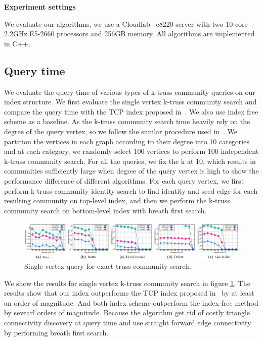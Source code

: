 \vskip 0.1in \noindent \textbf{Experiment settings} 

We evaluate our algorithms, we use a Cloudlab~\cite{RicciEide:login14} c8220 server with two 10-core 2.2GHz E5-2660 processors and 256GB memory. All algorithms are implemented in C++. 

\subsection{Query time}
\label{eval_query_time}

We evaluate the query time of various types of k-truss community queries on our index structure. We first evaluate the single vertex k-truss community search and compare the query time with the TCP index proposed in~\cite{huang2014querying}. We also use index free scheme as a baseline. As the k-truss community search time heavily rely on the degree of the query vertex, so we follow the similar procedure used in~\cite{huang2014querying}. We partition the vertices in each graph according to their degree into 10 categories and at each category, we randomly select 100 vertices to perform 100 independent k-truss community search. For all the queries, we fix the k at 10, which results in communities sufficiently large when degree of the query vertex is high to show the performance difference of different algorithms. For each query vertex, we first perform k-truss community identity search to find identity and seed edge for each resulting community on top-level index, and then we perform the k-truss community search on bottom-level index with breath first search.

\begin{figure}[ht]
    \centering
		\includegraphics[width=\linewidth]{./figures/example1.png}
    \caption{Single vertex query for exact truss community search.}
    \label{fig:single_v_query_degree}
\end{figure}

We show the results for single vertex k-truss community search in figure \ref{fig:single_v_query_degree}. The results show that our index outperforms the TCP index proposed in~\cite{huang2014querying} by at least an order of magnitude. And both index scheme outperform the index-free method by sevearl orders of magnitude. Because the algorithm get rid of costly triangle connectivity discovery at query time and use straight forward edge connectivity by performing breath first search. 
 
